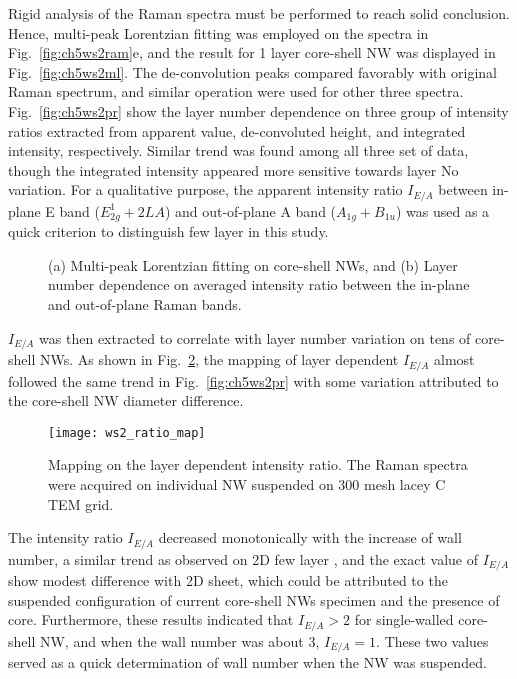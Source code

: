 Rigid analysis of the Raman spectra must be performed to reach solid conclusion. Hence, multi-peak Lorentzian fitting was employed on the spectra in Fig.~\ref{fig:ch5ws2ram}e, and the result for 1 layer  core-shell NW was displayed in Fig.~\ref{fig:ch5ws2ml}. The de-convolution peaks compared favorably with original Raman spectrum, and similar operation were used for other three spectra. Fig.~\ref{fig:ch5ws2pr} show the layer number dependence on three group of intensity ratios extracted from apparent value, de-convoluted height, and integrated intensity, respectively. Similar trend was found among all three set of data, though the integrated intensity appeared more sensitive towards layer No variation. For a qualitative purpose, the apparent intensity ratio $I_{E/A}$ between in-plane E band ($E_{2g}^1+2LA$) and out-of-plane A band ($A_{1g}+B_{1u}$) was used as a quick criterion to distinguish  few layer in this study. 
\begin{figure}[htb]
\centering
{}\hspace{0.04\textwidth}
\caption[Multi-peak Lorentzian fitting on core-shell NWs]{(a) Multi-peak Lorentzian fitting on core-shell NWs, and (b) Layer number dependence on averaged intensity ratio between the in-plane and out-of-plane Raman bands.}
\label{fig:ch5ws2prl}
\end{figure}
$I_{E/A}$ was then extracted to correlate with layer number variation on tens of core-shell NWs. As shown in Fig.~\ref{fig:ch5ws2ramap}, the mapping of  layer dependent $I_{E/A}$ almost followed the same trend in Fig.~\ref{fig:ch5ws2pr} with some variation attributed to the core-shell NW diameter difference.
\begin{figure}[htb]
\centering
\texttt{[image: ws2\_ratio\_map]}
\caption[Mapping on the  layer dependent intensity ratio]{Mapping on the  layer dependent intensity ratio. The Raman spectra were acquired on individual NW suspended on 300 mesh lacey C TEM grid.}
\label{fig:ch5ws2ramap}
\end{figure}
The intensity ratio $I_{E/A}$ decreased monotonically with the increase of  wall number, a similar trend as observed on 2D few layer ,\cite{Berkdemir2013} and the exact value of $I_{E/A}$ show modest difference with 2D sheet, which could be attributed to the suspended configuration of current core-shell NWs specimen and the presence of  core. Furthermore, these results indicated that $I_{E/A} > 2$ for single-walled  core-shell NW, and when the  wall number was about 3, $I_{E/A}=1$. These two values served as a quick determination of  wall number when the NW was suspended. 

